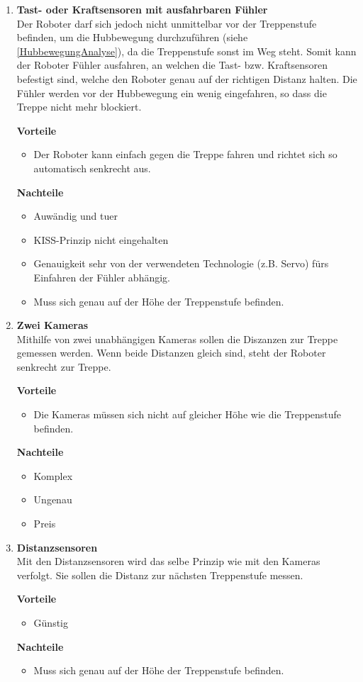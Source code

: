 \begin{enumerate}
    \item \textbf{Tast- oder Kraftsensoren mit ausfahrbaren Fühler}\\
    Der Roboter darf sich jedoch nicht unmittelbar vor der Treppenstufe befinden, um die Hubbewegung durchzuführen (siehe \ref{HubbewegungAnalyse}), da die Treppenstufe sonst im Weg steht. Somit kann der Roboter Fühler ausfahren, an welchen die Tast- bzw. Kraftsensoren befestigt sind, welche den Roboter genau auf der richtigen Distanz halten. Die Fühler werden vor der Hubbewegung ein wenig eingefahren, so dass die Treppe nicht mehr blockiert.
    
    \textbf{Vorteile}
    \begin{itemize}
        \item Der Roboter kann einfach gegen die Treppe fahren und richtet sich so automatisch senkrecht aus.
    \end{itemize}
    \textbf{Nachteile}
    \begin{itemize}
        \item Auwändig und tuer
        \item KISS-Prinzip nicht eingehalten
        \item Genauigkeit sehr von der verwendeten Technologie (z.B. Servo) fürs Einfahren der Fühler
        abhängig. 
        \item Muss sich genau auf der Höhe der Treppenstufe befinden.
    \end{itemize}
    
    \item \textbf{Zwei Kameras}\\
    Mithilfe von zwei unabhängigen Kameras sollen die Diszanzen zur Treppe gemessen werden. Wenn beide Distanzen gleich sind, steht der Roboter senkrecht zur Treppe.
    
    \textbf{Vorteile}
    \begin{itemize}
        \item Die Kameras müssen sich nicht auf gleicher Höhe wie die Treppenstufe befinden.
    \end{itemize}
    \textbf{Nachteile}
    \begin{itemize}
        \item Komplex
        \item Ungenau
        \item Preis
    \end{itemize}
    
    \item \textbf{Distanzsensoren}\\
    Mit den Distanzsensoren wird das selbe Prinzip wie mit den Kameras verfolgt. Sie sollen die Distanz zur nächsten Treppenstufe messen.
    
    \textbf{Vorteile}
    \begin{itemize}
        \item Günstig
    \end{itemize}
    \textbf{Nachteile}
    \begin{itemize}
        \item Muss sich genau auf der Höhe der Treppenstufe befinden.
    \end{itemize}
\end{enumerate}
